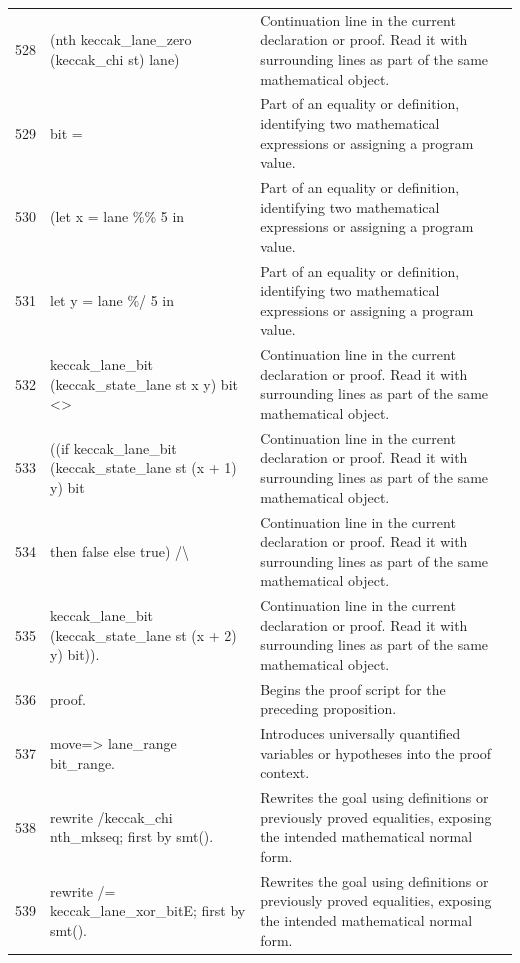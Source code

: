 \documentclass[10pt]{article}
\begin{document}
\begin{longtable}{r L{0.53\textwidth} L{0.37\textwidth}}
528 & {\ttfamily\scriptsize     (nth keccak\_lane\_zero (keccak\_chi st) lane)} & Continuation line in the current declaration or proof.  Read it with surrounding lines as part of the same mathematical object. \\
529 & {\ttfamily\scriptsize     bit =} & Part of an equality or definition, identifying two mathematical expressions or assigning a program value. \\
530 & {\ttfamily\scriptsize   (let x = lane \%\% 5 in} & Part of an equality or definition, identifying two mathematical expressions or assigning a program value. \\
531 & {\ttfamily\scriptsize    let y = lane \%/ 5 in} & Part of an equality or definition, identifying two mathematical expressions or assigning a program value. \\
532 & {\ttfamily\scriptsize    keccak\_lane\_bit (keccak\_state\_lane st x y) bit <>} & Continuation line in the current declaration or proof.  Read it with surrounding lines as part of the same mathematical object. \\
533 & {\ttfamily\scriptsize    ((if keccak\_lane\_bit (keccak\_state\_lane st (x + 1) y) bit} & Continuation line in the current declaration or proof.  Read it with surrounding lines as part of the same mathematical object. \\
534 & {\ttfamily\scriptsize      then false else true) /\textbackslash{}} & Continuation line in the current declaration or proof.  Read it with surrounding lines as part of the same mathematical object. \\
535 & {\ttfamily\scriptsize     keccak\_lane\_bit (keccak\_state\_lane st (x + 2) y) bit)).} & Continuation line in the current declaration or proof.  Read it with surrounding lines as part of the same mathematical object. \\
536 & {\ttfamily\scriptsize proof.} & Begins the proof script for the preceding proposition. \\
537 & {\ttfamily\scriptsize move=> lane\_range bit\_range.} & Introduces universally quantified variables or hypotheses into the proof context. \\
538 & {\ttfamily\scriptsize rewrite /keccak\_chi nth\_mkseq; first by smt().} & Rewrites the goal using definitions or previously proved equalities, exposing the intended mathematical normal form. \\
539 & {\ttfamily\scriptsize rewrite /= keccak\_lane\_xor\_bitE; first by smt().} & Rewrites the goal using definitions or previously proved equalities, exposing the intended mathematical normal form. \\

\end{longtable}
\end{document}
